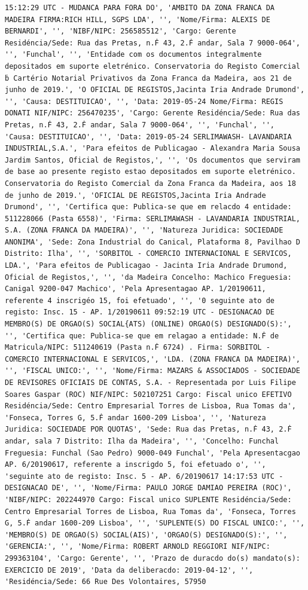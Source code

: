 \documentclass[
  12pt,
]{article}
\begin{document}
\begin{verbatim}
15:12:29 UTC - MUDANCA PARA FORA DO', 'AMBITO DA ZONA FRANCA DA MADEIRA FIRMA:RICH HILL, SGPS LDA', '', 'Nome/Firma: ALEXIS DE BERNARDI', '', 'NIBF/NIPC: 256585512', 'Cargo: Gerente Residéncia/Sede: Rua das Pretas, n.Ḟ 43, 2.Ḟ andar, Sala 7 9000-064', '', 'Funchal', '', 'Entidade com os documentos integralmente depositados em suporte eletrénico. Conservatoria do Registo Comercial ḃ Cartério Notarial Privativos da Zona Franca da Madeira, aos 21 de junho de 2019.', 'O OFICIAL DE REGISTOS,Jacinta Iria Andrade Drumond', '', 'Causa: DESTITUICAO', '', 'Data: 2019-05-24 Nome/Firma: REGIS DONATI NIF/NIPC: 256470235', 'Cargo: Gerente Residéncia/Sede: Rua das Pretas, n.Ḟ 43, 2.Ḟ andar, Sala 7 9000-064', '', 'Funchal', '', 'Causa: DESTITUICAO', '', 'Data: 2019-05-24 SERLIMAWASH- LAVANDARIA INDUSTRIAL,S.A.', 'Para efeitos de Publicagao - Alexandra Maria Sousa Jardim Santos, Oficial de Registos,', '', 'Os documentos que serviram de base ao presente registo estao depositados em suporte eletrénico. Conservatoria do Registo Comercial da Zona Franca da Madeira, aos 18 de junho de 2019.', 'OFICIAL DE REGISTOS,Jacinta Iria Andrade Drumond', '', 'Certifica que: Publica-se que em relacdo 4 entidade: 511228066 (Pasta 6558)', 'Firma: SERLIMAWASH - LAVANDARIA INDUSTRIAL, S.A. (ZONA FRANCA DA MADEIRA)', '', 'Natureza Juridica: SOCIEDADE ANONIMA', 'Sede: Zona Industrial do Canical, Plataforma 8, Pavilhao D Distrito: Ilha', '', 'SORBITOL - COMERCIO INTERNACIONAL E SERVICOS, LDA.', 'Para efeitos de Publicagao - Jacinta Iria Andrade Drumond, Oficial de Registos,', '', 'da Madeira Concelho: Machico Freguesia: Canigal 9200-047 Machico', 'Pela Apresentagao AP. 1/20190611, referente 4 inscrigéo 15, foi efetuado', '', '0 seguinte ato de registo: Insc. 15 - AP. 1/20190611 09:52:19 UTC - DESIGNACAO DE MEMBRO(S) DE ORGAO(S) SOCIAL{ATS) (ONLINE) ORGAO(S) DESIGNADO(S):', '', 'Certifica que: Publica-se que em relagao a entidade: N.Ḟ de Matricula/NIPC: 511240619 (Pasta n.Ḟ 6724) . Firma: SORBITOL - COMERCIO INTERNACIONAL E SERVICOS,', 'LDA. (ZONA FRANCA DA MADEIRA)', '', 'FISCAL UNICO:', '', 'Nome/Firma: MAZARS & ASSOCIADOS - SOCIEDADE DE REVISORES OFICIAIS DE CONTAS, S.A. - Representada por Luis Filipe Soares Gaspar (ROC) NIF/NIPC: 502107251 Cargo: Fiscal unico EFETIVO Residéncia/Sede: Centro Empresarial Torres de Lisboa, Rua Tomas da', 'Fonseca, Torres G, 5.Ḟ andar 1600-209 Lisboa', '', 'Natureza Juridica: SOCIEDADE POR QUOTAS', 'Sede: Rua das Pretas, n.Ḟ 43, 2.Ḟ andar, sala 7 Distrito: Ilha da Madeira', '', 'Concelho: Funchal Freguesia: Funchal (Sao Pedro) 9000-049 Funchal', 'Pela Apresentacgao AP. 6/20190617, referente a inscrigdo 5, foi efetuado o', '', 'seguinte ato de registo: Insc. 5 - AP. 6/20190617 14:17:53 UTC - DESIGNACAO DE', '', 'Nome/Firma: PAULO JORGE DAMIAO PEREIRA (ROC)', 'NIBF/NIPC: 202244970 Cargo: Fiscal unico SUPLENTE Residéncia/Sede: Centro Empresarial Torres de Lisboa, Rua Tomas da', 'Fonseca, Torres G, 5.Ḟ andar 1600-209 Lisboa', '', 'SUPLENTE(S) DO FISCAL UNICO:', '', 'MEMBRO(S) DE ORGAO(S) SOCIAL(AIS)', 'ORGAO(S) DESIGNADO(S):', '', 'GERENCIA:', '', 'Nome/Firma: ROBERT ARNOLD REGGIORI NIF/NIPC: 299363104', 'Cargo: Gerente', '', 'Prazo de duracdo do(s) mandato(s): EXERCICIO DE 2019', 'Data da deliberacdo: 2019-04-12', '', 'Residéncia/Sede: 66 Rue Des Volontaires, 57950 
\end{verbatim}
\end{document}

